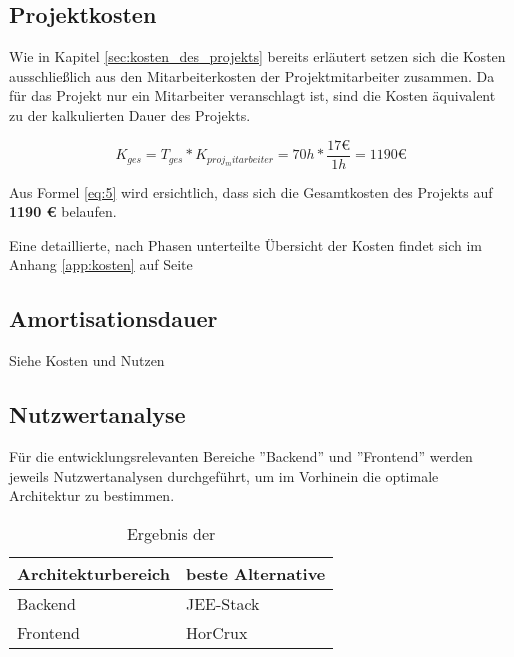 \documentclass[12pt, xcolor=dvipsnames]{scrartcl}
\begin{document}
\subsection{Projektkosten}

Wie in Kapitel \ref{sec:kosten_des_projekts} bereits erläutert setzen sich die Kosten ausschließlich aus den Mitarbeiterkosten der Projektmitarbeiter zusammen. Da für das Projekt nur ein Mitarbeiter veranschlagt ist, sind die Kosten äquivalent zu der kalkulierten Dauer des Projekts.

\begin{equation} \label{eq:5}
	K_{ges} = T_{ges} * K_{proj_mitarbeiter} = 70h * \frac{17 \euro}{1h} = 1190 \euro
\end{equation}

Aus Formel \ref{eq:5} wird ersichtlich, dass sich die Gesamtkosten des Projekts auf \textbf{1190 \euro{}} belaufen.

Eine detaillierte, nach Phasen unterteilte Übersicht der Kosten findet sich im Anhang \ref{app:kosten} auf Seite \pageref{app:kosten}

\subsection{Amortisationsdauer}

Siehe Kosten und Nutzen

\subsection{Nutzwertanalyse}
\label{sec:nutzwertanalyse}

Für die entwicklungsrelevanten Bereiche ''Backend'' und ''Frontend'' werden jeweils Nutzwertanalysen durchgeführt, um im Vorhinein die optimale Architektur zu bestimmen.

\begin{table}[H]
	\centering
	\begin{tabular}{ll}

		\rowcolor{white!15}				
		\textbf{Architekturbereich} & \textbf{beste Alternative} \\\hline		
				
		Backend & JEE-Stack \\
		Frontend & HorCrux	\\	
			    
	\end{tabular}
	\caption{Ergebnis der }
	\label{tab:nutzwertanalyse}
\end{table}
\end{document}
